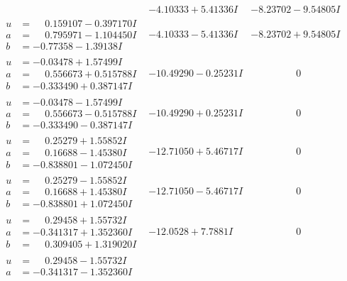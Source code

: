 \documentclass[1p]{elsarticle_modified}
\theoremstyle{definition}
\begin{document}
$$\begin{array}{c|c|c}
 & -4.10333 + 5.41336 I & -8.23702 - 9.54805 I \\ \hline\begin{aligned}
u &= \phantom{-}0.159107 - 0.397170 I \\
a &= \phantom{-}0.795971 - 1.104450 I \\
b &= -0.77358 - 1.39138 I\end{aligned}
 & -4.10333 - 5.41336 I & -8.23702 + 9.54805 I \\ \hline\begin{aligned}
u &= -0.03478 + 1.57499 I \\
a &= \phantom{-}0.556673 + 0.515788 I \\
b &= -0.333490 + 0.387147 I\end{aligned}
 & -10.49290 - 0.25231 I & \phantom{-0.000000 } 0 \\ \hline\begin{aligned}
u &= -0.03478 - 1.57499 I \\
a &= \phantom{-}0.556673 - 0.515788 I \\
b &= -0.333490 - 0.387147 I\end{aligned}
 & -10.49290 + 0.25231 I & \phantom{-0.000000 } 0 \\ \hline\begin{aligned}
u &= \phantom{-}0.25279 + 1.55852 I \\
a &= \phantom{-}0.16688 - 1.45380 I \\
b &= -0.838801 - 1.072450 I\end{aligned}
 & -12.71050 + 5.46717 I & \phantom{-0.000000 } 0 \\ \hline\begin{aligned}
u &= \phantom{-}0.25279 - 1.55852 I \\
a &= \phantom{-}0.16688 + 1.45380 I \\
b &= -0.838801 + 1.072450 I\end{aligned}
 & -12.71050 - 5.46717 I & \phantom{-0.000000 } 0 \\ \hline\begin{aligned}
u &= \phantom{-}0.29458 + 1.55732 I \\
a &= -0.341317 + 1.352360 I \\
b &= \phantom{-}0.309405 + 1.319020 I\end{aligned}
 & -12.0528 + 7.7881 I & \phantom{-0.000000 } 0 \\ \hline\begin{aligned}
u &= \phantom{-}0.29458 - 1.55732 I \\
a &= -0.341317 - 1.352360 I \\

\end{aligned}
\end{array}$$
\end{document}
